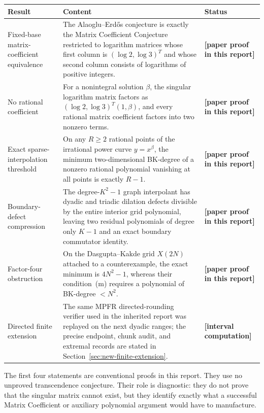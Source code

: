 \documentclass[11pt,oneside]{article}
\theoremstyle{definition}
\theoremstyle{remark}
\newcommand{\statusnew}{\textcolor{newgreen}{\textbf{[paper proof in this report]}}}
\newcommand{\statuscomp}{\textcolor{computeviolet}{\textbf{[interval computation]}}}
\begin{document}
\begin{center}
\begin{tabularx}{0.96\textwidth}{@{}>{\raggedright\arraybackslash}p{}X>{\raggedright\arraybackslash}p{}@{}}
\toprule
Result & Content & Status\\
\midrule
Fixed-base matrix-coefficient equivalence & The Alaoglu--Erd\H{o}s conjecture is exactly the Matrix Coefficient Conjecture restricted to logarithm matrices whose first column is $(\log2,\log3)^T$ and whose second column consists of logarithms of positive integers. & \statusnew\\
\addlinespace
No rational coefficient & For a nonintegral solution $\beta$, the singular logarithm matrix factors as $(\log2,\log3)^T(1,\beta)$, and every rational matrix coefficient factors into two nonzero terms. & \statusnew\\
\addlinespace
Exact sparse-interpolation threshold & On any $R\ge2$ rational points of the irrational power curve $y=x^\beta$, the minimum two-dimensional BK-degree of a nonzero rational polynomial vanishing at all points is exactly $R-1$. & \statusnew\\
\addlinespace
Boundary-defect compression & The degree-$K^2-1$ graph interpolant has dyadic and triadic dilation defects divisible by the entire interior grid polynomial, leaving two residual polynomials of degree only $K-1$ and an exact boundary commutator identity. & \statusnew\\
\addlinespace
Factor-four obstruction & On the Dasgupta--Kakde grid $X(2N)$ attached to a counterexample, the exact minimum is $4N^2-1$, whereas their condition~(m) requires a polynomial of BK-degree $<N^2$. & \statusnew\\
\addlinespace
Directed finite extension & The same MPFR directed-rounding verifier used in the inherited report was replayed on the next dyadic ranges; the precise endpoint, chunk audit, and extremal records are stated in Section~\ref{sec:new-finite-extension}. & \statuscomp\\
\bottomrule
\end{tabularx}
\end{center}

The first four statements are conventional proofs in this report.  They use no unproved
transcendence conjecture.  Their role is diagnostic: they do not prove that the singular matrix
cannot exist, but they identify exactly what a successful Matrix Coefficient or auxiliary
polynomial argument would have to manufacture.
\end{document}
